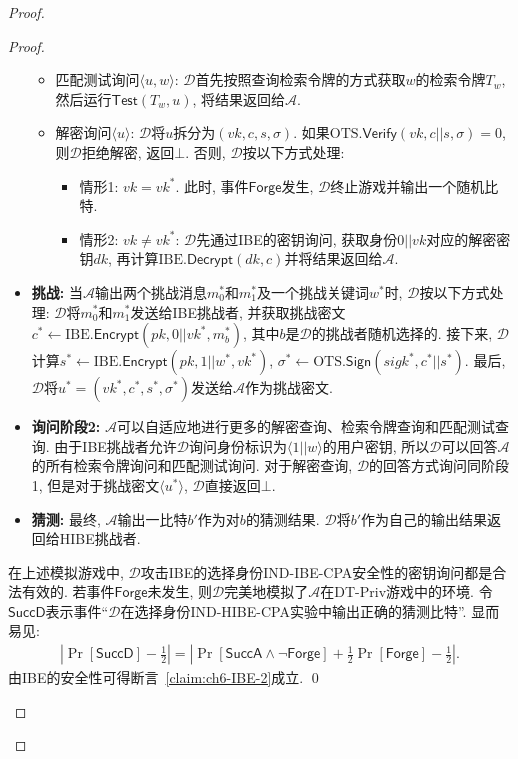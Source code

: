 \begin{proof}
\begin{proof}
\begin{trivlist}
\begin{itemize}
\begin{itemize}
			\item 匹配测试询问$\langle u, w \rangle$: $\mathcal{D}$首先按照查询检索令牌的方式获取$w$的检索令牌$T_w$, 然后运行$\mathsf{Test}(T_w, u)$, 将结果返回给$\mathcal{A}$.

			\item 解密询问$\langle u \rangle$: $\mathcal{D}$将$u$拆分为$(vk, c, s, \sigma)$.
				如果$\text{OTS}.\mathsf{Verify}(vk, c||s, \sigma) = 0$, 则$\mathcal{D}$拒绝解密, 返回$\bot$. 否则, $\mathcal{D}$按以下方式处理:
				\vspace{-0.5em}
				\begin{itemize} \itemsep 1pt \parskip 0pt \parsep 0pt
					\item 情形1: $vk = vk^*$. 此时, 事件$\mathsf{Forge}$发生, $\mathcal{D}$终止游戏并输出一个随机比特.

					\item 情形2: $vk \neq vk^*$: $\mathcal{D}$先通过IBE的密钥询问, 获取身份$0||vk$对应的解密密钥$dk$, 再计算$\text{IBE}.\mathsf{Decrypt}(dk, c)$并将结果返回给$\mathcal{A}$.
				\end{itemize}
		\end{itemize}

	\item \textbf{挑战:} 当$\mathcal{A}$输出两个挑战消息$m_0^*$和$m_1^*$及一个挑战关键词$w^*$时, $\mathcal{D}$按以下方式处理: $\mathcal{D}$将$m_0^*$和$m_1^*$发送给IBE挑战者, 并获取挑战密文$c^* \leftarrow \text{IBE}.\mathsf{Encrypt}(pk, 0||vk^*, m_b^*)$, 其中$b$是$\mathcal{D}$的挑战者随机选择的. 接下来, $\mathcal{D}$计算$s^* \leftarrow \text{IBE}.\mathsf{Encrypt}(pk, 1||w^*, vk^*)$, $\sigma^* \leftarrow \text{OTS}.\mathsf{Sign}(sigk^*, c^*||s^*)$. 
		最后, $\mathcal{D}$将$u^* = (vk^*, c^*, s^*, \sigma^*)$发送给$\mathcal{A}$作为挑战密文.

	\item \textbf{询问阶段2:} $\mathcal{A}$可以自适应地进行更多的解密查询、检索令牌查询和匹配测试查询. 由于IBE挑战者允许$\mathcal{D}$询问身份标识为$\langle 1||w \rangle$的用户密钥, 所以$\mathcal{D}$可以回答$\mathcal{A}$的所有检索令牌询问和匹配测试询问. 对于解密查询, $\mathcal{D}$的回答方式询问同阶段1, 但是对于挑战密文$\langle u^*\rangle$, $\mathcal{D}$直接返回$\bot$.

	\item \textbf{猜测:} 最终, $\mathcal{A}$输出一比特$b'$作为对$b$的猜测结果. $\mathcal{D}$将$b'$作为自己的输出结果返回给HIBE挑战者. 	
\end{itemize}

在上述模拟游戏中, $\mathcal{D}$攻击IBE的选择身份IND-IBE-CPA安全性的密钥询问都是合法有效的. 若事件$\mathsf{Forge}$未发生, 则$\mathcal{D}$完美地模拟了$\mathcal{A}$在DT-Priv游戏中的环境. 令$\mathsf{SuccD}$表示事件``$\mathcal{D}$在选择身份IND-HIBE-CPA实验中输出正确的猜测比特''. 显而易见: 
\[
\begin{array}{l}
	\left|\Pr[\mathsf{SuccD}]-\frac{1}{2}\right|  =  \left|\Pr[\mathsf{SuccA} \wedge \neg\mathsf{Forge}] + \frac{1}{2}\Pr[\mathsf{Forge}] -\frac{1}{2}\right|.
\end{array}
\]
由IBE的安全性可得断言~\ref{claim:ch6-IBE-2}成立. \qed
\end{trivlist}


\end{proof}
\end{proof}
